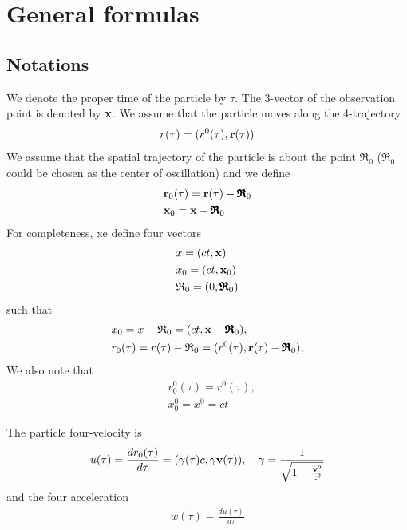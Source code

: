 \section{General formulas}

\subsection{Notations}

We denote the proper time of the particle by $\tau$. The 3-vector of the observation point is denoted by ${\bf x}$. We assume that the particle moves along the 4-trajectory
\begin{align}
    r(\tau) = (r^0(\tau),{\bf r}(\tau))
\end{align}
We assume that the spatial trajectory of the particle is about the point $\pmb{\mathfrak R}_0$ (${\pmb{\mathfrak R}}_0$ could be chosen as the center of oscillation) and we define
\begin{align}
     & {\bf r}_0(\tau) = {\bf r}(\tau) - \pmb{\mathfrak R}_0 \\
     & {\bf x}_0 = {\bf x}-\pmb{\mathfrak R}_0
\end{align}
For completeness, xe define four vectors
\begin{align}
     & x = (ct,{\bf x})                          \\
     & x_0 = (ct,{\bf x}_0)                      \\
     & {\mathfrak R}_0 = (0,\pmb{\mathfrak R}_0)
\end{align}
such that
\begin{align}
     & x_0 = x -{\mathfrak R}_0 = (ct, {\bf x}-\pmb{\mathfrak R}_0),                            \\
     & r_0(\tau) = r(\tau) -{\mathfrak R}_0 = (r^0(\tau), {\bf r}(\tau) - \pmb{\mathfrak R}_0),
\end{align}
We also note that
\begin{align}
     & r_0^0(\tau) = r^0(\tau), \\
     & x_0^0 = x^0 = ct
\end{align}

The particle four-velocity is
\begin{align}
    u(\tau)=\frac{dr_0(\tau)}{d\tau}=(\gamma(\tau)c,\gamma{\bf v}(\tau)),\quad \gamma=\frac1{\sqrt{1-\frac{{\bf v}^2}{c^2}}}
\end{align}
and the four acceleration
\begin{align}
    w(\tau) = \frac{du(\tau)}{d\tau}
\end{align}

